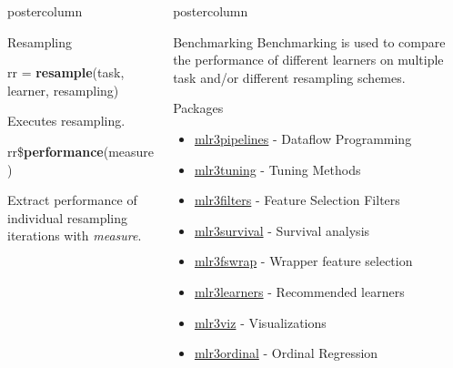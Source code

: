 \documentclass{beamer}
\newlength{\columnheight} %
\begin{document}
\begin{frame}[fragile]{}
\begin{columns}
\begin{column}{.31\textwidth}
\begin{beamercolorbox}[center]{postercolumn}
\begin{minipage}{.98\textwidth}
{\begin{myblock}{Resampling}
\begin{codebox}
							rr = \textbf{resample}(task, learner, resampling)
						\end{codebox}
						\hspace*{1ex}Executes resampling.
						\\
						\begin{codebox}
							rr\$\textbf{performance}(measure)
						\end{codebox}
						\hspace*{1ex}Extract performance of individual resampling iterations with \textit{measure}.
					\end{myblock}\vfill
				}
			\end{minipage}
		\end{beamercolorbox}
	\end{column}
	\begin{column}{.31\textwidth}
		\begin{beamercolorbox}[center]{postercolumn}
			\begin{minipage}{.98\textwidth}
				\parbox[t][\columnheight]{\textwidth}{
					\begin{myblock}{Benchmarking}
						Benchmarking is used to compare the performance of different learners on multiple task and/or different resampling schemes.
					\end{myblock}
					\begin{myblock}{Packages}
						\begin{itemize}
							\item \href{https://github.com/mlr-org/mlr3pipelines}{mlr3pipelines} - Dataflow Programming
							\item \href{https://github.com/mlr-org/mlr3tuning}{mlr3tuning} - Tuning Methods
							\item \href{https://github.com/mlr-org/mlr3filters}{mlr3filters} - Feature Selection Filters
							\item \href{https://github.com/mlr-org/mlr3survival}{mlr3survival} - Survival analysis
							\item \href{https://github.com/mlr-org/mlr3fswrap}{mlr3fswrap} - Wrapper feature selection
							\item \href{https://github.com/mlr-org/mlr3learners}{mlr3learners} - Recommended learners
							\item \href{https://github.com/mlr-org/mlr3viz}{mlr3viz} - Visualizations
							\item \href{https://github.com/mlr-org/mlr3ordinal}{mlr3ordinal} - Ordinal Regression
						\end{itemize}
					\end{myblock}
}
\end{minipage}
\end{beamercolorbox}
\end{column}
\end{columns}
\end{frame}
\end{document}
